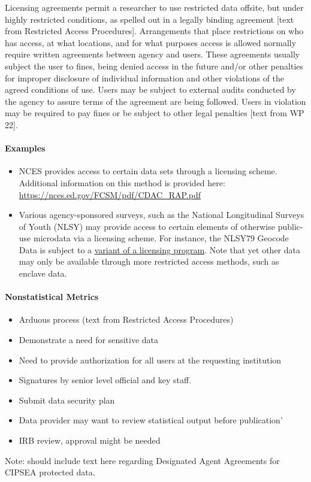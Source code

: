 Licensing agreements permit a researcher to use restricted data offsite, but under highly restricted
conditions, as spelled out in a legally binding agreement [text from Restricted Access Procedures]. Arrangements that place restrictions on who has access, at what locations, and for what purposes access is allowed normally require written agreements between agency and users. These agreements usually subject the user to fines, being denied access in the future and/or other penalties for improper disclosure of individual information and other violations of the agreed conditions of use. Users may be subject to external audits conducted by the agency to assure terms of the agreement are being followed. Users in violation may be required to pay fines or be subject to other legal penalties [text from WP 22].







\paragraph{Examples}
\begin{itemize}
    \item NCES provides access to certain data sets through a licensing scheme. Additional information on this method is provided here: \url{https://nces.ed.gov/FCSM/pdf/CDAC\_RAP.pdf}
    \item Various agency-sponsored surveys, such as the National Longitudinal Surveys of Youth (NLSY) may provide access to certain elements of otherwise public-use microdata via a licensing scheme. For instance, the NLSY79 Geocode Data is subject to a \href{https://www.bls.gov/nls/questions-and-answers.htm#anch25}{variant of a licensing program}. Note that yet other data may only be available through more restricted access methods, such as enclave data.
\end{itemize}



\paragraph{Nonstatistical Metrics}

\begin{itemize}
    \item Arduous process (text from Restricted Access Procedures)
    \item  Demonstrate a need for sensitive data
    \item  Need to provide authorization for all users at the requesting institution 
    \item Signatures by senior level official and key staff.
    \item Submit data security plan
    \item Data provider may want to review statistical output before publication’
    \item  IRB review, approval might be needed
    \end{itemize}
Note: should include text here regarding Designated Agent Agreements for CIPSEA protected data.

